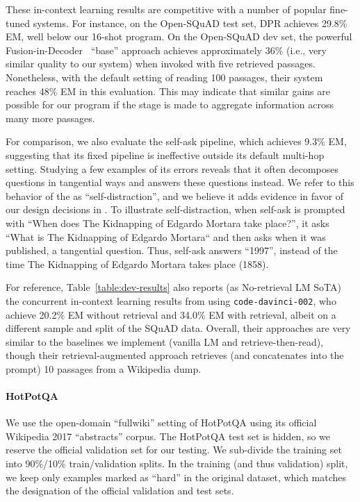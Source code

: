 These in-context learning results are competitive with a number of popular fine-tuned systems. For instance, on the Open-SQuAD test set, DPR achieves 29.8\% EM, well below our 16-shot \DSP program. On the Open-SQuAD dev set, the powerful Fusion-in-Decoder~\cite{izacard2020leveraging} ``base'' approach achieves approximately 36\% (i.e., very similar quality to our system) when invoked with five retrieved passages. Nonetheless, with the default setting of reading 100 passages, their system reaches 48\% EM in this evaluation. This may indicate that similar gains are possible for our \DSP program if the \predict stage is made to aggregate information across many more passages.

For comparison, we also evaluate the self-ask pipeline, which achieves 9.3\% EM, suggesting that its fixed pipeline is ineffective outside its default multi-hop setting. Studying a few examples of its errors reveals that it often decomposes questions in tangential ways and answers these questions instead. We refer to this behavior of the \LM as ``self-distraction'', and we believe it adds evidence in favor of our design decisions in \DSP. To illustrate self-distraction, when self-ask is prompted with ``When does The Kidnapping of Edgardo Mortara take place?'', it asks ``What is The Kidnapping of Edgardo Mortara`` and then asks when it was published, a tangential question. Thus, self-ask answers ``1997'', instead of the time The Kidnapping of Edgardo Mortara takes place (1858).

For reference, Table~\ref{table:dev-results} also reports (as No-retrieval LM SoTA) the concurrent in-context learning results from \citet{si2022prompting} using \texttt{code-davinci-002}, who achieve 20.2\% EM without retrieval and 34.0\% EM with retrieval, albeit on a different sample and split of the SQuAD data. Overall, their approaches are very similar to the baselines we implement (vanilla LM and retrieve-then-read), though their retrieval-augmented approach retrieves (and concatenates into the prompt) 10 passages from a Wikipedia dump.



\paragraph{HotPotQA} We use the open-domain ``fullwiki'' setting of HotPotQA using its official Wikipedia 2017 ``abstracts'' corpus. The HotPotQA test set is hidden, so we reserve the official validation set for our testing. We sub-divide the training set into 90\%/10\% train/validation splits. In the training (and thus validation) split, we keep only examples marked as ``hard'' in the original dataset, which matches the designation of the official validation and test sets.

